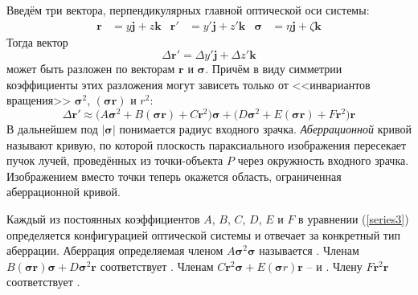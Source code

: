 Введём три вектора, перпендикулярных главной оптической оси системы:
\begin{align*}
\mathbf{r} &= y\mathbf{j} + z\mathbf{k} & \mathbf{r}' &= y'\mathbf{j} + z'\mathbf{k} & \bm{\sigma} &= \eta\mathbf{j} + \zeta\mathbf{k}
\end{align*}
Тогда вектор 
\begin{equation*}
\Delta \mathbf{r}' = \Delta y'\mathbf{j} + \Delta z'\mathbf{k}
\end{equation*}
может быть разложен по векторам $\mathbf{r}$ и $\bm{\sigma}$.
Причём в виду симметрии коэффициенты этих разложения могут зависеть только от <<инвариантов вращения>> $\bm{\sigma}^{2}$, $(\bm{\sigma}\mathbf{r})$ и $r^{2}$:
\begin{equation}
\label{series3}
\Delta \mathbf{r}' \approx \Big(A\bm{\sigma}^{2} + B(\bm{\sigma}\mathbf{r}) + C\mathbf{r}^{2}\Big)\bm{\sigma} + \Big(D\bm{\sigma}^{2} + E(\bm{\sigma}\mathbf{r}) + F\mathbf{r}^{2}\Big)\mathbf{r}
\end{equation}
В дальнейшем под $|\bm{\sigma}|$ понимается радиус входного зрачка. \textit{Аберрационной} кривой называют кривую, по которой плоскость параксиального изображения пересекает пучок лучей, проведённых из точки-объекта $P$ через окружность входного зрачка. Изображением вместо точки теперь окажется область, ограниченная аберрационной кривой.

Каждый из постоянных коэффициентов $A$, $B$, $C$, $D$, $E$ и $F$ в уравнении (\ref{series3}) определяется конфигурацией оптической системы и отвечает за конкретный тип аберрации. Аберрация определяемая членом $A\bm{\sigma}^{2}\bm{\sigma}$ называется \color{blue}{сферической}\normalcolor. Членам $B(\bm{\sigma}\mathbf{r})\bm{\sigma} + D\bm{\sigma}^{2}\mathbf{r}$ соответствует \color{blue}{кома}\normalcolor. Членам $C\mathbf{r}^{2}\bm{\sigma} + E(\bm{\sigma} r)\mathbf{r}$ -- \color{blue}{астигматизм косых лучей} \normalcolor и \color{blue}{искривление плоскости изображения}\normalcolor. Члену $F\mathbf{r}^{2}\mathbf{r}$  соответствует \color{blue}{дисторсия}\normalcolor.
